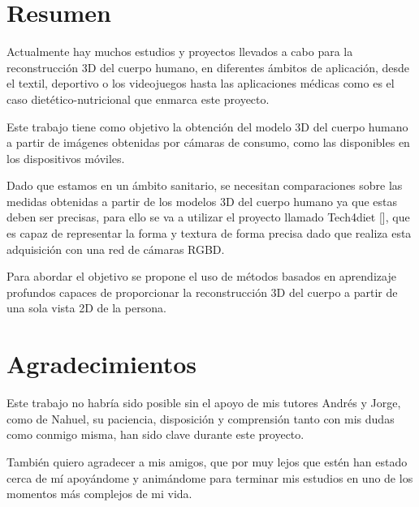 
\chapter*{Resumen}
\thispagestyle{empty}


Actualmente hay muchos estudios y proyectos llevados a cabo para la reconstrucción  3D del cuerpo humano, en diferentes ámbitos de aplicación, desde el textil, deportivo o los videojuegos hasta las aplicaciones médicas como es el caso dietético-nutricional que enmarca este proyecto.

Este trabajo tiene como objetivo la obtención del modelo 3D del cuerpo humano a partir de imágenes obtenidas por cámaras de consumo, como las disponibles en los dispositivos móviles. 

Dado que estamos en un ámbito sanitario, se necesitan comparaciones sobre las medidas obtenidas a partir de los modelos 3D del cuerpo humano ya que estas deben ser precisas, para ello se va a utilizar el proyecto llamado Tech4diet [\cite{tech}], que es capaz de representar la forma y textura de forma precisa dado que realiza esta adquisición con una red de cámaras RGBD. 

Para abordar el objetivo se propone el uso de métodos basados en aprendizaje profundos capaces de proporcionar la reconstrucción 3D del cuerpo a partir de una sola vista 2D de la persona.


\cleardoublepage %
\chapter*{Agradecimientos
}

\thispagestyle{empty}
\vspace{1cm}

Este trabajo no habría sido posible sin el apoyo de mis tutores Andrés y Jorge, como de Nahuel, su paciencia, disposición y comprensión tanto con mis dudas como conmigo misma, han sido clave durante este proyecto.

También quiero agradecer a mis amigos, que por muy lejos que estén han estado cerca de mí apoyándome y animándome para terminar mis estudios en uno de los momentos más complejos de mi vida.


